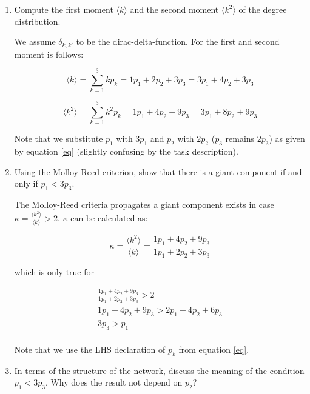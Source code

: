 \begin{enumerate}
	\item Compute the first moment $\langle k \rangle$ and the second moment $\langle k^2 \rangle$ of the degree distribution.
	
	We assume $\delta_{k,k'}$ to be the dirac-delta-function. For the first and second moment is follows:
	
	\begin{equation*}
		\langle k \rangle = \sum_{k = 1}^3 k p_k = 1p_1 + 2p_2 + 3p_3 = 3p_1 + 4p_2 + 3p_3
	\end{equation*}

	\begin{equation*}
		\langle k^2 \rangle = \sum_{k = 1}^3 k^2 p_k = 1p_1 + 4p_2 + 9p_3 = 3p_1 + 8p_2 + 9p_3
	\end{equation*}
	
	Note that we substitute $p_1$ with $3p_1$ and $p_2$ with $2p_2$ ($p_3$ remains $2p_3$) as given by equation \ref{eq} (slightly confusing by the task description).
	
	\item Using the Molloy-Reed criterion, show that there is a giant component if and only if $p_1 < 3p_3$.
	
	The Molloy-Reed criteria propagates a giant component exists in case $\kappa = \frac{\langle k^2 \rangle}{\langle k \rangle} > 2$. $\kappa$ can be calculated as:
	
	\begin{equation*}
		\kappa = \frac{\langle k^2 \rangle}{\langle k \rangle} = \frac{1p_1 + 4p_2 + 9p_3}{1p_1 + 2p_2 + 3p_3}
	\end{equation*}

	which is only true for 
	
	\begin{equation*}
		\begin{split}
			\frac{1p_1 + 4p_2 + 9p_3}{1p_1 + 2p_2 + 3p_3} > 2 \\
			1p_1 + 4p_2 + 9p_3 > 2p_1 + 4p_2 + 6p_3 \\
			3p_3 > p_1 \\
		\end{split}
	\end{equation*}

	Note that we use the LHS declaration of $p_k$ from equation \ref{eq}.
	
	\item In terms of the structure of the network, discuss the meaning of the condition $p_1 < 3p_3$. Why does the result not depend on $p_2$?
	

\end{enumerate}
